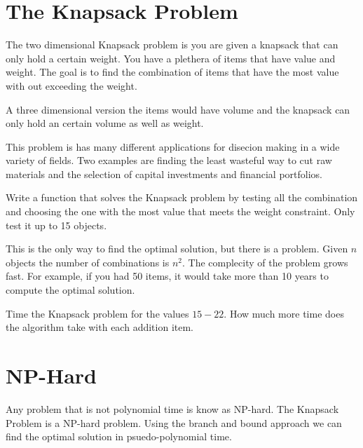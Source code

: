 \label{Ch:Knapsack}


\section*{The Knapsack Problem}


The two dimensional Knapsack problem is you are given a knapsack that can only hold a certain weight. You have a plethera of items that have value and weight. The goal is to find the combination of items that have the most value with out exceeding the weight.

A three dimensional version the items would have volume and the knapsack can only hold an certain volume as well as weight. 

This problem is has many different applications for disecion making in a wide variety of fields. Two examples are finding the least wasteful way to cut raw materials and the selection of capital investments and financial portfolios.

\begin{problem}
Write a function that solves the Knapsack problem by testing all the combination and choosing the one with the most value that meets the weight constraint. Only test it up to 15 objects.
\end{problem}

This is the only way to find the optimal solution, but there is a problem. Given $n$ objects the number of combinations is $n^2$. The complecity of the problem grows fast. For example, if you had 50 items, it would take more than 10 years to compute the optimal solution.

\begin{problem}
Time the Knapsack problem for the values $15-22$. How much more time does the algorithm take with each addition item.
\end{problem}

\section*{NP-Hard}

Any problem that is not polynomial time is know as NP-hard. The Knapsack Problem is a NP-hard problem. Using the branch and bound approach we can find the optimal solution in psuedo-polynomial time.

